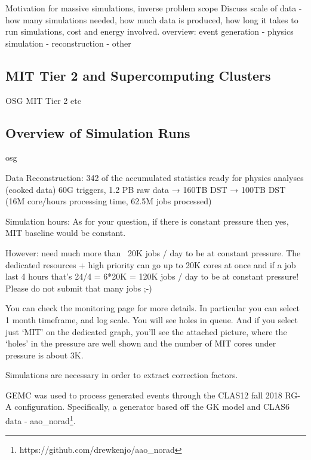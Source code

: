 Motivation for massive simulations, inverse problem scope
    Discuss scale of data - how many simulations needed, how much data is produced, how long it takes to run simulations, cost and energy involved.
    overview: event generation - physics simulation - reconstruction - other
    \subsection{MIT Tier 2 and Supercomputing Clusters}
        OSG MIT Tier 2 etc
    \subsection{Overview of Simulation Runs}

osg \parencite{OSG2006OSG} \parencite{Sfiligoi2009TheGlideinWMS} \parencite{Pordes2007TheGrid}


Data Reconstruction: 342 of the accumulated statistics ready for physics analyses (cooked data)
60G triggers, 1.2 PB raw data → 160TB DST → 100TB DST (16M core/hours processing time, 62.5M jobs processed)

    Simulation hours: 
    As for your question, if there is constant pressure then yes, MIT baseline would be constant.

However: need much more than ~20K jobs / day to be at constant pressure. The dedicated resources + high priority can go up to 20K cores at once and if a job last 4 hours that’s 24/4 = 6*20K = 120K jobs / day to be at constant pressure! Please do not submit that many jobs ;-)

You can check the monitoring page for more details. In particular you can select 1 month timeframe, and log scale. You will see holes in queue.
And if you select just ‘MIT’ on the dedicated graph, you’ll see the attached picture, where the ‘holes’ in the pressure are well shown and the number of MIT cores under pressure is about 3K.

 Simulations are necessary in order to extract correction factors.
    
    GEMC was used to process generated events through the CLAS12 fall 2018 RG-A configuration. Specifically, a generator based off the GK model and CLAS6 data - aao\_norad\footnote{https://github.com/drewkenjo/aao\_norad}. 
